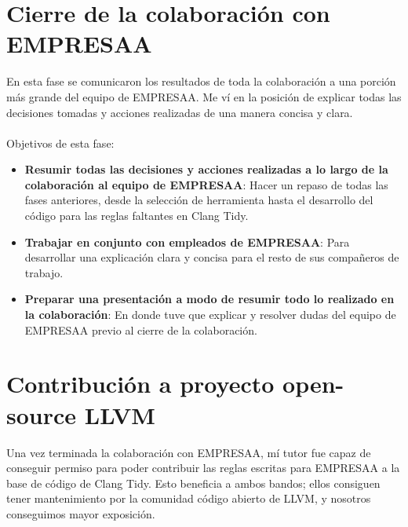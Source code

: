 \documentclass[12pt]{extreport} %
\begin{document}
\section{Cierre de la colaboración con EMPRESAA}

En esta fase se comunicaron los resultados de toda la colaboración a
una porción más grande del equipo de EMPRESAA. Me ví en la posición de
explicar todas las decisiones tomadas y acciones realizadas de una
manera concisa y clara.

\paragraph{}
Objetivos de esta fase:
\begin{itemize}
\item \textbf{Resumir todas las decisiones y acciones realizadas a lo
  largo de la colaboración al equipo de EMPRESAA}: Hacer un repaso de
  todas las fases anteriores, desde la selección de herramienta hasta
  el desarrollo del código para las reglas faltantes en Clang Tidy.
\item \textbf{Trabajar en conjunto con empleados de EMPRESAA}: Para
  desarrollar una explicación clara y concisa para el resto de sus
  compañeros de trabajo.
\item \textbf{Preparar una presentación a modo de resumir todo lo
  realizado en la colaboración}: En donde tuve que explicar y resolver
  dudas del equipo de EMPRESAA previo al cierre de la colaboración.
\end{itemize}

\section{Contribución a proyecto open-source LLVM}

Una vez terminada la colaboración con EMPRESAA, mí tutor fue capaz de
conseguir permiso para poder contribuir las reglas escritas para
EMPRESAA a la base de código de Clang Tidy. Esto beneficia a ambos
bandos; ellos consiguen tener mantenimiento por la comunidad código
abierto de LLVM, y nosotros conseguimos mayor exposición.
\end{document}
